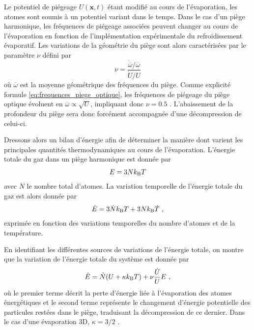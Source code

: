 Le potentiel de piégeage $U(\mathbf{x},t)$ étant modifié au cours de l'évaporation, les atomes sont soumis à un potentiel variant dans le temps. Dans le cas d'un piège harmonique, les fréquences de piégeage associées peuvent changer au cours de l'évaporation en fonction de l'implémentation expérimentale du refroidissement évaporatif. %
Les variations de la géométrie du piège sont alors caractérisées par le paramètre $\nu$ défini par
\begin{equation}
\nu=\frac{\dot{\overline{\omega}}/\overline{\omega}}{\dot{U}/U}
\end{equation}
où $\overline{\omega}$ est la moyenne géométrique des fréquences du piège. Comme explicité formule \ref{eq:frequences_piege_optique}, les fréquences de piégeage du piège optique évoluent en $\overline{\omega}\propto\sqrt{U}$, impliquant donc $\nu=0.5$ \citep{o2001scaling}. L'abaissement de la profondeur du piège sera donc forcément accompagnée d'une décompression de celui-ci. 




Dressons alors un bilan d'énergie afin de déterminer la manière dont varient les principales quantités thermodynamiques au cours de l'évaporation. L'énergie totale du gaz dans un piège harmonique est donnée par
\begin{equation}
E=3Nk_{\mathrm{B}} T
\end{equation}
avec $N$ le nombre total d'atomes. La variation temporelle de l'énergie totale du gaz est alors donnée par
\begin{equation}
\dot{E}=3\dot{N} k_{\mathrm{B}} T + 3 N k_{\mathrm{B}} \dot{T} \text{ ,}
\label{eq:variation_energie_derivee}
\end{equation}
exprimée en fonction des variations temporelles du nombre d'atomes et de la température.

En identifiant les différentes sources de variations de l'énergie totale, on montre que la variation de l'énergie totale du système est donnée par \citep{cohen1996atomes}
\begin{equation}
\dot{E}=\dot{N}(U+\kappa k_{\mathrm{B}} T) +\nu\frac{\dot{U}}{U}E \text{ ,}
\label{eq:variation_energie_bilan}
\end{equation}
où le premier terme décrit la perte d'énergie liée à l'évaporation des atomes énergétiques et le second terme représente le changement d'énergie potentielle des particules restées dans le piège, traduisant la décompression de ce dernier. Dans le cas d'une évaporation 3D, $\kappa=3/2$ \citep{ketterle1996evaporative}.

